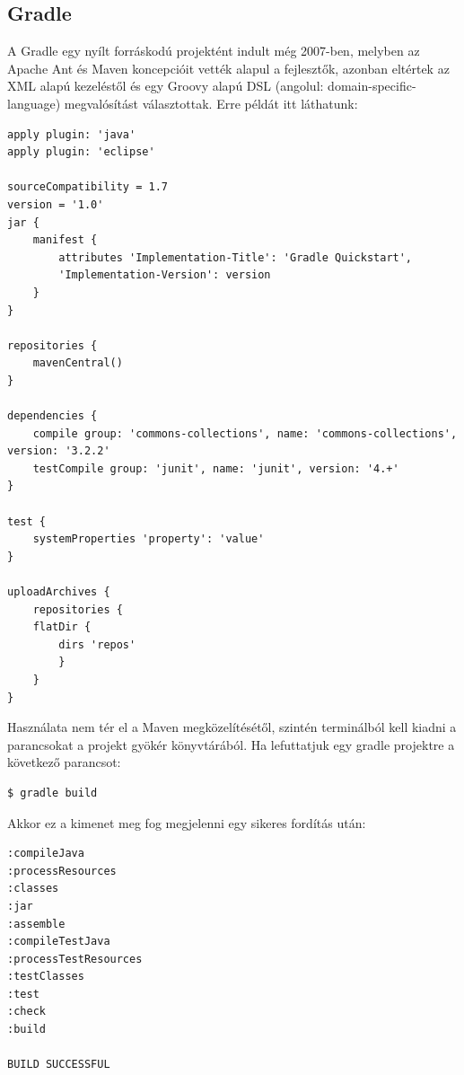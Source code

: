 \documentclass{article}
\begin{document}
\subsection{Gradle}\label{subsec:gradle}
A Gradle egy nyílt forráskodú projektént indult még 2007-ben, melyben az Apache Ant és Maven koncepcióit vették alapul a fejlesztők, azonban eltértek az XML alapú kezeléstől és egy Groovy alapú DSL (angolul: domain-specific-language) megvalósítást választottak. Erre példát itt láthatunk: 
\begin{lstlisting}
apply plugin: 'java'
apply plugin: 'eclipse'

sourceCompatibility = 1.7
version = '1.0'
jar {
	manifest {
		attributes 'Implementation-Title': 'Gradle Quickstart',
		'Implementation-Version': version
	}
}

repositories {
	mavenCentral()
}

dependencies {
	compile group: 'commons-collections', name: 'commons-collections', version: '3.2.2'
	testCompile group: 'junit', name: 'junit', version: '4.+'
}

test {
	systemProperties 'property': 'value'
}

uploadArchives {
	repositories {
	flatDir {
		dirs 'repos'
		}
	}
}
\end{lstlisting}
Használata nem tér el a Maven megközelítésétől, szintén terminálból kell kiadni a parancsokat a projekt gyökér könyvtárából. Ha lefuttatjuk egy gradle projektre a következő parancsot:
\begin{lstlisting}[language=bash]
$ gradle build
\end{lstlisting}
Akkor ez a kimenet meg fog megjelenni egy sikeres fordítás után:
\begin{lstlisting}[language=bash]
:compileJava
:processResources
:classes
:jar
:assemble
:compileTestJava
:processTestResources
:testClasses
:test
:check
:build

BUILD SUCCESSFUL
\end{lstlisting}
\end{document}
